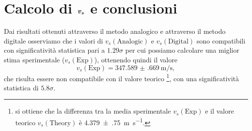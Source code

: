 \documentclass[
    prl,
    reprint, 
    superscriptaddress, 
    altaffilletter, 
    amsmath, 
    amssymb, 
    a4paper,
    varvw]{revtex4-2}
\begin{document}
\section{Calcolo di $\vb*{v_s}$ e conclusioni}\label{sec:conclusion_compute}

Dai risultati ottenuti attraverso il metodo analogico e attraverso il metodo digitale osserviamo che i valori di $v_s(\text{Analogic})$ e $v_s(\text{Digital})$ sono compatibili con significatività statistica pari a $1.29\sigma$ per cui possiamo calcolare una miglior stima sperimentale ($v_s(\text{Exp})$), ottenendo quindi il valore \[v_s(\text{Exp}) = \SI{347.589(669)}{\metre\per\second},\] che risulta essere non compatibile con il valore teorico \footnote{si ottiene che la differenza tra la media sperimentale $v_s(\text{Exp})$ e il valore teorico $v_s(\text{Theory})$ è \SI[separate-uncertainty=true]{4.379(750)}{\metre\per\second}.}, con una significatività statistica di $5.8\sigma$. 
\end{document}
